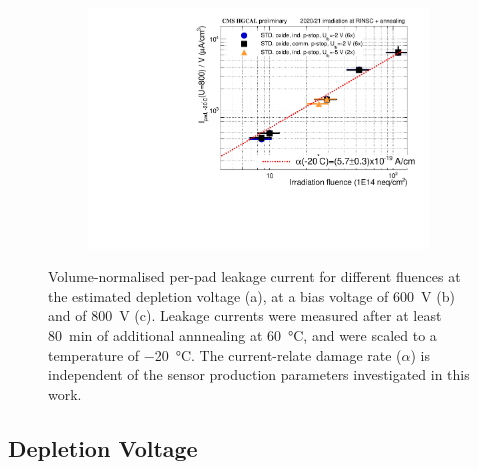 \begin{figure}
\begin{subfigure}[b]{0.49\textwidth}
		\subcaption{
			}
			\label{plot:alpha_600}
	\end{subfigure}
	\hfill
	\begin{subfigure}[b]{0.49\textwidth}
		\centering
		\includegraphics[width=0.99\textwidth]{plots/alpha/alpha_800V.pdf}
		\subcaption{
			}
			\label{plot:alpha_800}
	\end{subfigure}
	\caption{
	    Volume-normalised per-pad leakage current for different fluences at the estimated depletion voltage (a), at a bias voltage of \SI{600}{\volt} (b) and of \SI{800}{\volt} (c).
		Leakage currents were measured after at least \SI{80}{\minute} of additional annnealing at \SI{60}{\celsius}, and were scaled to a temperature of \SI{-20}{\celsius}.
        The current-relate damage rate ($\alpha$) is independent of the sensor production parameters investigated in this work.
	}
\end{figure}

\subsection{Depletion Voltage}

